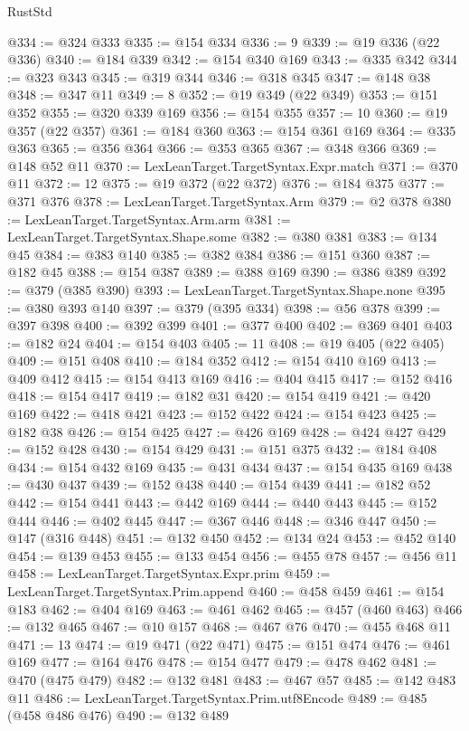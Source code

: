 \begin{lexlean}{RustStd}
\begin{coremodule}
@334 := @324 @333
@335 := @154 @334
@336 := 9
@339 := @19 @336 (@22 @336)
@340 := @184 @339
@342 := @154 @340 @169
@343 := @335 @342
@344 := @323 @343
@345 := @319 @344
@346 := @318 @345
@347 := @148 @38
@348 := @347 @11
@349 := 8
@352 := @19 @349 (@22 @349)
@353 := @151 @352
@355 := @320 @339 @169
@356 := @154 @355
@357 := 10
@360 := @19 @357 (@22 @357)
@361 := @184 @360
@363 := @154 @361 @169
@364 := @335 @363
@365 := @356 @364
@366 := @353 @365
@367 := @348 @366
@369 := @148 @52 @11
@370 := LexLeanTarget.TargetSyntax.Expr.match
@371 := @370 @11
@372 := 12
@375 := @19 @372 (@22 @372)
@376 := @184 @375
@377 := @371 @376
@378 := LexLeanTarget.TargetSyntax.Arm
@379 := @2 @378
@380 := LexLeanTarget.TargetSyntax.Arm.arm
@381 := LexLeanTarget.TargetSyntax.Shape.some
@382 := @380 @381
@383 := @134 @45
@384 := @383 @140
@385 := @382 @384
@386 := @151 @360
@387 := @182 @45
@388 := @154 @387
@389 := @388 @169
@390 := @386 @389
@392 := @379 (@385 @390)
@393 := LexLeanTarget.TargetSyntax.Shape.none
@395 := @380 @393 @140
@397 := @379 (@395 @334)
@398 := @56 @378
@399 := @397 @398
@400 := @392 @399
@401 := @377 @400
@402 := @369 @401
@403 := @182 @24
@404 := @154 @403
@405 := 11
@408 := @19 @405 (@22 @405)
@409 := @151 @408
@410 := @184 @352
@412 := @154 @410 @169
@413 := @409 @412
@415 := @154 @413 @169
@416 := @404 @415
@417 := @152 @416
@418 := @154 @417
@419 := @182 @31
@420 := @154 @419
@421 := @420 @169
@422 := @418 @421
@423 := @152 @422
@424 := @154 @423
@425 := @182 @38
@426 := @154 @425
@427 := @426 @169
@428 := @424 @427
@429 := @152 @428
@430 := @154 @429
@431 := @151 @375
@432 := @184 @408
@434 := @154 @432 @169
@435 := @431 @434
@437 := @154 @435 @169
@438 := @430 @437
@439 := @152 @438
@440 := @154 @439
@441 := @182 @52
@442 := @154 @441
@443 := @442 @169
@444 := @440 @443
@445 := @152 @444
@446 := @402 @445
@447 := @367 @446
@448 := @346 @447
@450 := @147 (@316 @448)
@451 := @132 @450
@452 := @134 @24
@453 := @452 @140
@454 := @139 @453
@455 := @133 @454
@456 := @455 @78
@457 := @456 @11
@458 := LexLeanTarget.TargetSyntax.Expr.prim
@459 := LexLeanTarget.TargetSyntax.Prim.append
@460 := @458 @459
@461 := @154 @183
@462 := @404 @169
@463 := @461 @462
@465 := @457 (@460 @463)
@466 := @132 @465
@467 := @10 @157
@468 := @467 @76
@470 := @455 @468 @11
@471 := 13
@474 := @19 @471 (@22 @471)
@475 := @151 @474
@476 := @461 @169
@477 := @164 @476
@478 := @154 @477
@479 := @478 @462
@481 := @470 (@475 @479)
@482 := @132 @481
@483 := @467 @57
@485 := @142 @483 @11
@486 := LexLeanTarget.TargetSyntax.Prim.utf8Encode
@489 := @485 (@458 @486 @476)
@490 := @132 @489

\end{coremodule}
\end{lexlean}
